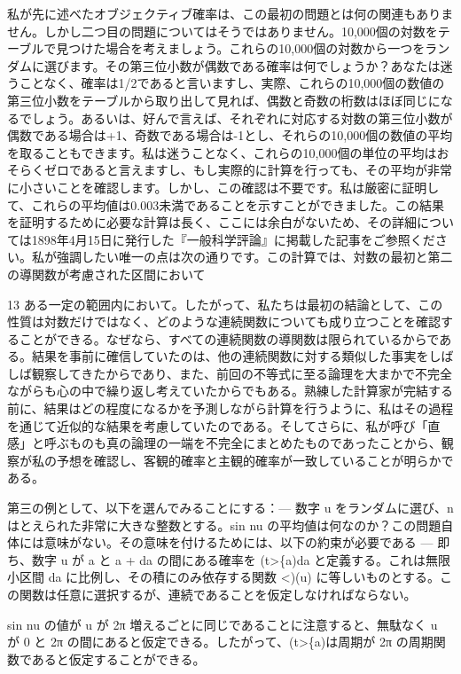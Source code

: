 \documentclass[a4paper,11pt,openany]{ltjsbook}
\begin{document}
私が先に述べたオブジェクティブ確率は、この最初の問題とは何の関連もありません。しかし二つ目の問題についてはそうではありません。10,000個の対数をテーブルで見つけた場合を考えましょう。これらの10,000個の対数から一つをランダムに選びます。その第三位小数が偶数である確率は何でしょうか？あなたは迷うことなく、確率は1/2であると言いますし、実際、これらの10,000個の数値の第三位小数をテーブルから取り出して見れば、偶数と奇数の桁数はほぼ同じになるでしょう。あるいは、好んで言えば、それぞれに対応する対数の第三位小数が偶数である場合は+1、奇数である場合は-1とし、それらの10,000個の数値の平均を取ることもできます。私は迷うことなく、これらの10,000個の単位の平均はおそらくゼロであると言えますし、もし実際的に計算を行っても、その平均が非常に小さいことを確認します。しかし、この確認は不要です。私は厳密に証明して、これらの平均値は0.003未満であることを示すことができました。この結果を証明するために必要な計算は長く、ここには余白がないため、その詳細については1898年4月15日に発行した『一般科学評論』に掲載した記事をご参照ください。私が強調したい唯一の点は次の通りです。この計算では、対数の最初と第二の導関数が考慮された区間において

13 ある一定の範囲内において。したがって、私たちは最初の結論として、この性質は対数だけではなく、どのような連続関数についても成り立つことを確認することができる。なぜなら、すべての連続関数の導関数は限られているからである。結果を事前に確信していたのは、他の連続関数に対する類似した事実をしばしば観察してきたからであり、また、前回の不等式に至る論理を大まかで不完全ながらも心の中で繰り返し考えていたからでもある。熟練した計算家が完結する前に、結果はどの程度になるかを予測しながら計算を行うように、私はその過程を通じて近似的な結果を考慮していたのである。そしてさらに、私が呼び「直感」と呼ぶものも真の論理の一端を不完全にまとめたものであったことから、観察が私の予想を確認し、客観的確率と主観的確率が一致していることが明らかである。

第三の例として、以下を選んでみることにする：— 数字 u をランダムに選び、n はとえられた非常に大きな整数とする。sin nu の平均値は何なのか？この問題自体には意味がない。その意味を付けるためには、以下の約束が必要である — 即ち、数字 u が a と a + da の間にある確率を (t>\{a)da と定義する。これは無限小区間 da に比例し、その積にのみ依存する関数 <)(u) に等しいものとする。この関数は任意に選択するが、連続であることを仮定しなければならない。

sin nu の値が u が 2π 増えるごとに同じであることに注意すると、無駄なく u が 0 と 2π の間にあると仮定できる。したがって、(t>\{a)は周期が 2π の周期関数であると仮定することができる。
\end{document}
